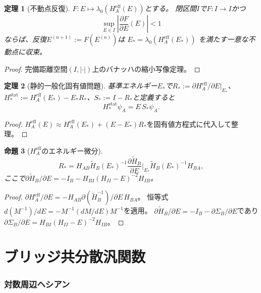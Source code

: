 \documentclass[12pt]{article}
\theoremstyle{plain}
\newtheorem{theorem}{定理}[section]
\newtheorem{proposition}[theorem]{命題}
\theoremstyle{definition}
\numberwithin{equation}{section}
\newcommand{\eff}{\mathrm{eff}}
\newcommand{\stat}{\mathrm{stat}}
\begin{document}
\begin{theorem}[不動点反復]\label{thm:fixedpoint}
$F:E\mapsto\lambda_0(H_A^{\eff}(E))$とする。
閉区間$I$で$F:I\to I$かつ
\[
\sup_{E\in I}\left|\frac{\partial F}{\partial E}(E)\right|<1
\]
ならば、反復$E^{(n+1)}:=F(E^{(n)})$は
$E_*=\lambda_0(H_A^{\eff}(E_*))$
を満たす一意な不動点に収束。
\end{theorem}

\begin{proof}
完備距離空間$(I,|\cdot|)$上のバナッハの縮小写像定理。
\end{proof}

\begin{theorem}[静的一般化固有値問題]\label{thm:static}
基準エネルギー$E_*$で$R_*:=\partial H_A^{\eff}/\partial E|_{E_*}$、$H_*^{\stat}:=H_A^{\eff}(E_*)-E_*R_*$、$S_*:=I-R_*$と定義すると
\begin{equation}\label{eq:geneig}
\boxed{H_*^{\stat}\psi_A = E\,S_*\psi_A.}
\end{equation}
\end{theorem}

\begin{proof}
$H_A^{\eff}(E)\approx H_A^{\eff}(E_*)+(E-E_*)R_*$を固有値方程式に代入して整理。
\end{proof}

\begin{proposition}[$H_A^{\eff}$のエネルギー微分]\label{prop:Rstar}
\begin{equation}
R_* = H_{AB}\widetilde{H}_B(E_*)^{-1}
\frac{\partial\widetilde{H}_B}{\partial E}\bigg|_{E_*}
\widetilde{H}_B(E_*)^{-1}H_{BA},
\end{equation}
ここで$\partial\widetilde{H}_B/\partial E=-I_B-H_{BI}(H_{II}-E)^{-2}H_{IB}$。
\end{proposition}

\begin{proof}
$\partial H_A^{\eff}/\partial E
=-H_{AB}\partial(\widetilde{H}_B^{-1})/\partial E\,H_{BA}$。
恒等式$d(M^{-1})/dE=-M^{-1}(dM/dE)M^{-1}$を適用。
$\partial\widetilde{H}_B/\partial E
=-I_B-\partial\Sigma_B/\partial E$であり
$\partial\Sigma_B/\partial E
=H_{BI}(H_{II}-E)^{-2}H_{IB}$。
\end{proof}


\part{ブリッジ共分散汎関数}

\section{対数周辺ヘシアン}\label{sec:hessian}
\end{document}
